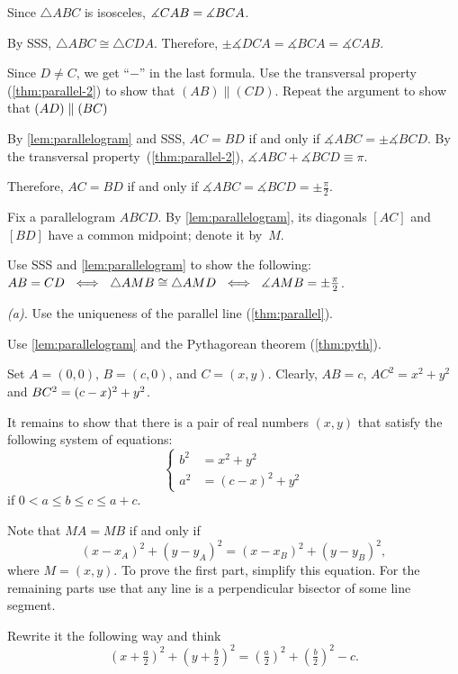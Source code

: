 Since $\triangle ABC$ is isosceles, $\measuredangle CAB=\measuredangle BCA$.
 
By SSS, $\triangle ABC\cong \triangle CDA$.
Therefore, 
$\pm\measuredangle DCA= \measuredangle BCA=\measuredangle CAB$.

Since $D\ne C$, we get ``$-$'' in the last formula.
Use the transversal property (\ref{thm:parallel-2}) to show that $(AB)\parallel (CD)$. Repeat the argument to show that $(AD)\parallel(BC)$ 

By \ref{lem:parallelogram} and SSS, 
$AC=BD$
if and only if
$\measuredangle ABC=\pm \measuredangle BCD$.
By the transversal property~(\ref{thm:parallel-2}), 
$\measuredangle ABC+\measuredangle BCD\equiv \pi$.

Therefore, 
$AC=BD$
if and only if
$\measuredangle ABC
=\measuredangle BCD
=\pm\tfrac\pi2$.

Fix a parallelogram $ABCD$.
By \ref{lem:parallelogram},
its diagonals $[AC]$ and $[BD]$ have a common midpoint; denote it by~$M$.

Use SSS and \ref{lem:parallelogram} to show the following:
$AB=CD\ \iff\ \triangle AMB
\cong
\triangle AMD\ \iff\ \measuredangle AMB
=
\pm\tfrac\pi2$.


 \textit{(a).} Use the uniqueness of the parallel line (\ref{thm:parallel}).

 Use \ref{lem:parallelogram} and the Pythagorean theorem (\ref{thm:pyth}).

Set $A=(0,0)$, $B=(c,0)$, and $C=(x,y)$.
Clearly, $AB=c$,
$AC^2=x^2+y^2$ and $BC^2=(c-x)^2+y^2$.

It remains to show that there is a pair of real numbers $(x,y)$ 
that satisfy the following system of equations:
$$
\left\{
\begin{aligned}
b^2&=x^2+y^2
\\
a^2&=(c-x)^2+y^2
\end{aligned}
\right.
$$
if $0<a\le b\le c\le a+c$.

 Note that $MA=MB$ if and only if
\[(x-x_A)^2+(y-y_A)^2=(x-x_B)^2+(y-y_B)^2,\]
where $M=(x,y)$. 
To prove the first part, simplify this equation.
For the remaining parts use that any line is a perpendicular bisector of some line segment.

 Rewrite it the following way and think 
\[(x+\tfrac a2)^2+(y+\tfrac b2)^2=(\tfrac a2)^2+(\tfrac b2)^2-c.\]


